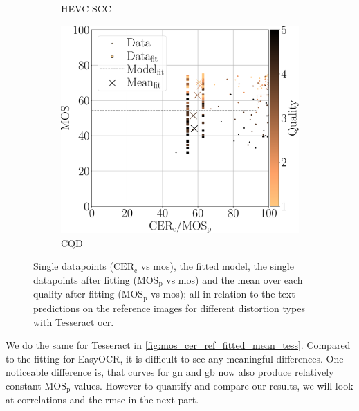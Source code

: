 \begin{figure}[h!]
\begin{subfigure}[b]{0.32\textwidth}
        \caption{HEVC-SCC}
        \label{fig:mos_cer_ref_fitted_mean_tess_HEVC-SCC}
    \end{subfigure}%
    \hfill
    \begin{subfigure}[b]{0.32\textwidth}
        \includegraphics[width=\textwidth]{../../images/analyze/mos_cer_ref_fitted_mean_tess_CQD.pdf}
        \caption{CQD}
        \label{fig:mos_cer_ref_fitted_mean_tess_CQD}
    \end{subfigure}%
    \caption{Single datapoints ($\text{CER}_{\text{c}}$ vs \gls{mos}), the fitted model, the single datapoints after fitting ($\text{MOS}_{\text{p}}$ vs \gls{mos}) and the mean over each quality after fitting ($\text{MOS}_{\text{p}}$ vs \gls{mos}); all in relation to the text predictions on the reference images for different distortion types with Tesseract \gls{ocr}.}
\label{fig:mos_cer_ref_fitted_mean_tess}
\end{figure}

We do the same for Tesseract in \autoref{fig:mos_cer_ref_fitted_mean_tess}.
Compared to the fitting for EasyOCR, it is difficult to see any meaningful differences.
One noticeable difference is, that curves for \gls{gn} and \gls{gb} now also produce relatively constant $\text{MOS}_{\text{p}}$ values.
However to quantify and compare our results, we will look at correlations and the \gls{rmse} in the next part.

